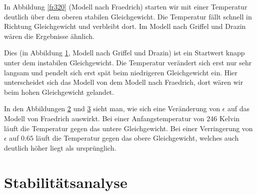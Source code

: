 \documentclass[]{report}
\begin{document}
In Abbildung \ref{fr320} (Modell nach Fraedrich) starten wir mit einer Temperatur deutlich über dem oberen stabilen Gleichgewicht. Die Temperatur fällt schnell in Richtung Gleichgewicht und verbleibt dort. Im Modell nach Griffel und Drazin wären die Ergebnisse ähnlich.

\begin{figure}[h!] \centering \def\svgwidth{\columnwidth} \caption{} \label{gd288}  \end{figure}

Dies (in Abbildung \ref{gd288}, Modell nach Griffel und Drazin) ist ein Startwert knapp unter dem instabilen Gleichgewicht. Die Temperatur verändert sich erst nur sehr langsam und pendelt sich erst spät beim niedrigeren Gleichgewicht ein. Hier unterscheidet sich das Modell von dem Modell nach Fraedrich, dort wären wir beim hohen Gleichgewicht gelandet.

\begin{figure}[h!] \centering \def\svgwidth{\columnwidth} \caption{} \label{fr246}  \end{figure}

\begin{figure}[h!] \centering \def\svgwidth{\columnwidth} \caption{} \label{epsilon}  \end{figure}

In den Abbildungen \ref{fr246} und \ref{epsilon} sieht man, wie sich eine Veränderung von $\epsilon$ auf das Modell von Fraedrich auswirkt. Bei einer Anfangstemperatur von 246 Kelvin
läuft die Temperatur gegen das untere Gleichgewicht. Bei einer Verringerung von $\epsilon$ auf $0.65$ läuft die Temperatur gegen das obere Gleichgewicht, welches auch deutlich höher liegt als ursprünglich.


\section{Stabilitätsanalyse}

\begin{figure}[h!] \centering \def\svgwidth{\columnwidth}  \caption{} \label{stabfr} \end{figure}
\begin{figure}[h!] \centering \def\svgwidth{\columnwidth}  \caption{} \label{stabgd} \end{figure}
\end{document}
